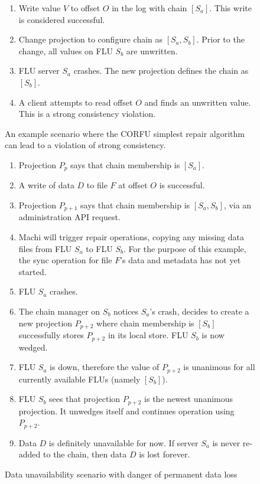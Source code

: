 \documentclass[preprint,10pt]{sigplanconf}
\begin{document}
\begin{figure}
\begin{enumerate}
\item Write value $V$ to offset $O$ in the log with chain $[S_a]$.
  This write is considered successful.
\item Change projection to configure chain as $[S_a,S_b]$.  Prior to
  the change, all values on FLU $S_b$ are unwritten.
\item FLU server $S_a$ crashes.  The new projection defines the chain
  as $[S_b]$.
\item A client attempts to read offset $O$ and finds an unwritten
  value.  This is a strong consistency violation.
\end{enumerate}
\caption{An example scenario where the CORFU simplest repair algorithm
  can lead to a violation of strong consistency.}
\label{fig:corfu-repair-sc-violation}
\end{figure}

\begin{figure}
\begin{enumerate}
\item Projection $P_p$ says that chain membership is $[S_a]$.
\item A write of data $D$ to file $F$ at offset $O$ is successful.
\item Projection $P_{p+1}$ says that chain membership is $[S_a,S_b]$, via
   an administration API request.
\item Machi will trigger repair operations, copying any missing data
   files from FLU $S_a$ to FLU $S_b$.  For the purpose of this
   example, the sync operation for file $F$'s data and metadata has
   not yet started.
\item FLU $S_a$ crashes.
\item The chain manager on $S_b$ notices $S_a$'s crash,
   decides to create a new projection $P_{p+2}$ where chain membership is
   $[S_b]$
  successfully stores $P_{p+2}$ in its local store.  FLU $S_b$ is now wedged.
\item FLU $S_a$ is down, therefore the
   value of $P_{p+2}$ is unanimous for all currently available FLUs
   (namely $[S_b]$).
\item FLU $S_b$ sees that projection $P_{p+2}$ is the newest unanimous
   projection.  It unwedges itself and continues operation using $P_{p+2}$.
\item Data $D$ is definitely unavailable for now.  If server $S_a$ is
  never re-added to the chain, then data $D$ is lost forever.
\end{enumerate}
\caption{Data unavailability scenario with danger of permanent data loss}
\label{fig:data-loss2}
\end{figure}
\end{document}
